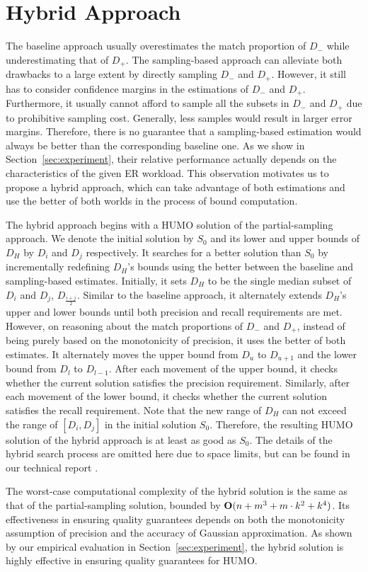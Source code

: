 \section{Hybrid Approach}\label{sec:hybrid}

  The baseline approach usually overestimates the match proportion of $D_-$ while underestimating that of $D_+$. The sampling-based approach can alleviate both drawbacks to a large extent by directly sampling $D_-$ and $D_+$. However, it still has to consider confidence margins in the estimations of $D_-$ and $D_+$. Furthermore, it usually cannot afford to sample all the subsets in $D_-$ and $D_+$ due to prohibitive sampling cost. Generally, less samples would result in larger error margins. Therefore, there is no guarantee that a sampling-based estimation would always be better than the corresponding baseline one. As we show in Section~\ref{sec:experiment}, their relative performance actually depends on the characteristics of the given ER workload. This observation motivates us to propose a hybrid approach, which can take advantage of both estimations and use the better of both worlds in the process of bound computation.

  The hybrid approach begins with a HUMO solution of the partial-sampling approach. We denote the initial solution by $S_0$ and its lower and upper bounds of $D_H$ by $D_i$ and $D_j$ respectively. It searches for a better solution than $S_0$ by incrementally redefining $D_H$'s bounds using the better between the baseline and sampling-based estimates. Initially, it sets $D_H$ to be the single median subset of $D_i$ and $D_j$, $D_{\frac{i+j}{2}}$. Similar to the baseline approach, it alternately extends $D_H$'s upper and lower bounds until both precision and recall requirements are met. However, on reasoning about the match proportions of $D_-$ and $D_+$, instead of being purely based on the monotonicity of precision, it uses the better of both estimates. It alternately moves the upper bound from $D_u$ to $D_{u+1}$ and the lower bound from $D_l$ to $D_{l-1}$. After each movement of the upper bound, it checks whether the current solution satisfies the precision requirement. Similarly, after each movement of the lower bound, it checks whether the current solution satisfies the recall requirement. Note that the new range of $D_H$ can not exceed the range of $[D_i, D_j]$ in the initial solution $S_0$. Therefore, the resulting HUMO solution of the hybrid approach is at least as good as $S_0$. The details of the hybrid search process are omitted here due to space limits, but can be found in our technical report \cite{chen2017humoreport}.

  The worst-case computational complexity of the hybrid solution is the same as that of the partial-sampling solution, bounded by ${\bf O}(n+m^3+m\cdot k^2+k^4)$. Its effectiveness in ensuring quality guarantees depends on both the monotonicity assumption of precision and the accuracy of Gaussian approximation. As shown by our empirical evaluation in Section~\ref{sec:experiment}, the hybrid solution is highly effective in ensuring quality guarantees for HUMO.
